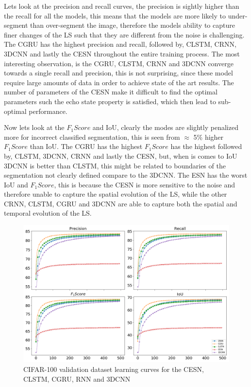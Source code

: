 \documentclass{WitsPhysicsReport}
\begin{document}
Lets look at the precision and recall curves, the precision is sightly higher than the recall for all the models, this means that the models are more likely to under-segment than over-segment the image, therefore the models ability to capture finer changes of the LS such that they are different from the noise is challenging. The CGRU has the highest precision and recall, followed by, CLSTM, CRNN, 3DCNN and lastly the CESN throughout the entire training process. The most interesting observation, is the CGRU, CLSTM, CRNN and  3DCNN converge towards a single recall and precision, this is not surprising, since these model require large amounts of data in order to achieve state of the art results. The number of parameters of the CESN make it difficult to find the optimal parameters such the echo state property is satisfied, which then lead to sub-optimal performance.

Now lets look at the $F_{1}Score$ and IoU, clearly the modes are slightly penalized more for incorrect classified segmentation, this is seen from $\approx$ 5\% higher $F_{1}Score$ than IoU. The CGRU has the highest $F_{1}Score$ has the highest  followed by, CLSTM, 3DCNN, CRNN and lastly the CESN, but, when is comes to IoU 3DCNN is better than CLSTM, this might be related to boundaries of the segmentation not clearly defined compare to the 3DCNN. The ESN has the worst IoU and $F_{1}Score$, this is because the CESN is more sensitive to the noise and therefore unable to capture the spatial evolution of the LS, while the other CRNN, CLSTM, CGRU and 3DCNN are able to capture both the spatial and temporal evolution of the LS.


\begin{figure}[H]
\centering
  \includegraphics[width=1\textwidth]{Figure/Results/CIFAR_10_performance.png}
\caption{CIFAR-100 validation dataset learning curves for the CESN, CLSTM, CGRU, RNN and 3DCNN}
 \label{fig:cifar_100_model_perfomance}
\end{figure}
\end{document}
